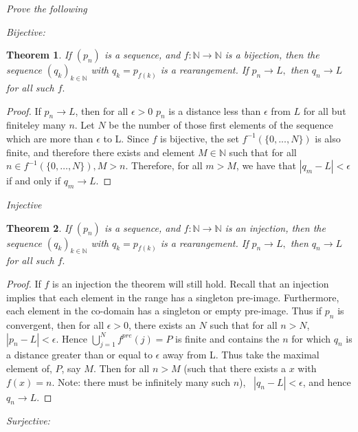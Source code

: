 \documentclass[letter]{article}
\newtheorem{theorem}{Theorem}
\newenvironment{menumerate}{%
  \edef\backupindent{\the\parindent}%
  \enumerate%
  \setlength{\parindent}{\backupindent}%
}{\endenumerate}
\begin{document}
\begin{menumerate}
 	 \setcounter{enumi}{11}
 	 \item \textit{Prove the following}
 	 	\begin{menumerate}
 	 		\item \textit{Bijective:} 
		 	 	\begin{theorem}
		 	 		If $(p_n)$ is a sequence, and $f: \mathbb{N} \to \mathbb{N}$  is a bijection, then the sequence $(q_k)_{k\in \mathbb{N}}$ with $q_k = p_{f(k)}$ is a rearangement. If $p_n \to L, $ then $q_n \to L$ for all such $f.$
		 	 	\end{theorem}
		 	 	\begin{proof}
		 	 		If $p_n \to L$, then for all $\epsilon > 0$ $p_n$ is a distance less than $\epsilon$ from $L$ for all but finiteley many $n$. Let $N$ be the number of those first elements of the sequence which are more than $\epsilon$ to L. Since $f$ is bijective, the set $f^{-1}(\{0,...,N\})$ is also finite, and therefore there exists and element $M \in \mathbb{N}$ such that for all $n \in f^{-1}(\{0,\dots,N\}), M > n$. Therefore, for all $m > M$, we have that $|q_m - L|< \epsilon$ if and only if $q_m \to L$.
		 	 	\end{proof}
	 	 	\item \textit{Injective}
		 	 	\begin{theorem}
		 	 		If $(p_n)$ is a sequence, and $f: \mathbb{N} \to \mathbb{N}$  is an injection, then the sequence $(q_k)_{k\in \mathbb{N}}$ with $q_k = p_{f(k)}$ is a rearangement. If $p_n \to L, $ then $q_n \to L$ for all such $f.$
		 	 	\end{theorem}
		 	 	\begin{proof}
		 	 	If $f$ is an injection the theorem will still hold. Recall that an injection implies that each element in the range has a singleton pre-image. Furthermore, each element in the co-domain has a singleton or empty pre-image. Thus if $p_n$ is convergent, then for all $\epsilon > 0$, there exists an $N$ such that for all $n > N$, $ |p_n - L | < \epsilon$. Hence $\bigcup_{j=1}^N f^{pre}(j) = P$ is finite and contains the $n$ for which $q_n$ is a distance greater than or equal to $\epsilon$ away from L. Thus take the maximal element of, $P$, say $M$. Then for all $n > M$ (such that there exists a $x$ with $f(x) = n$. Note: there must be infinitely many such $n$), \  $|q_n - L | < \epsilon$, and hence $q_n \to L.$
		 	 	\end{proof}
	 	 \item \textit{Surjective:}

\end{menumerate}
\end{menumerate}
\end{document}
